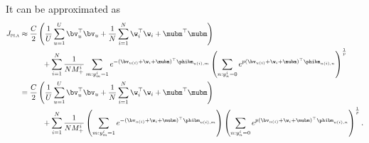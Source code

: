 It can be approximated as
\begin{equation*}
\begin{aligned}
J_\textsc{pla} 
&\approx \frac{C}{2} \left( \frac{1}{U} \sum_{u=1}^U \bv_u^\top \bv_u + \frac{1}{N} \sum_{i=1}^N \w_i^\top \w_i + \mubm^\top \mubm \right) \\
& \hspace{3em}
  + \sum_{i=1}^N \frac{1}{N M_+^i} \sum_{m: y_m^i = 1} 
    e^{-(\bv_{u(i)} + \w_i + \mubm)^\top \phibm_{u(i),m}}
    \left( \sum_{n: y_n^i = 0} e^{p (\bv_{u(i)} + \w_i + \mubm)^\top \phibm_{u(i),n}} \right)^\frac{1}{p} \\
&= \frac{C}{2} \left( \frac{1}{U} \sum_{u=1}^U \bv_u^\top \bv_u + \frac{1}{N} \sum_{i=1}^N \w_i^\top \w_i + \mubm^\top \mubm \right) \\
& \hspace{3em}
  + \sum_{i=1}^N \frac{1}{N M_+^i} 
    \left( \sum_{m: y_m^i = 1} e^{-(\bv_{u(i)} + \w_i + \mubm)^\top \phibm_{u(i),m}} \right)
    \left( \sum_{n: y_n^i = 0} e^{p (\bv_{u(i)} + \w_i + \mubm)^\top \phibm_{u(i),n}} \right)^\frac{1}{p}.
\end{aligned}
\end{equation*}

